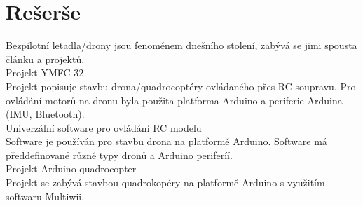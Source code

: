 \chapter{Rešerše}
\label{1-reserse}

Bezpilotní letadla/drony jsou fenoménem dnešního stolení, zabývá se jimi spousta článku a projektů. \\
Projekt YMFC-32\\

Projekt popisuje stavbu drona/quadrocoptéry ovládaného přes RC soupravu. Pro ovládání motorů na dronu byla použita platforma Arduino a periferie Arduina (IMU, Bluetooth).\\

Univerzální software pro ovládání RC modelu\\
Software je používán pro stavbu drona na platformě Arduino. Software má předdefinované různé typy dronů a Arduino periferíí.\\

Projekt Arduino quadrocopter\\
Projekt se zabývá stavbou quadrokopéry na platformě Arduino s využitím softwaru  Multiwii.\\


